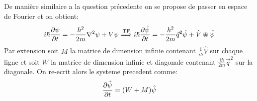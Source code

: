 \documentclass[10pt,a4paper]{article}
\begin{document}
\subsection{}
De manière similaire a la question précedente on se propose de passer en espace de Fourier et on obtient:
\[
i \hbar \pdv{\psi}{t} = -\frac{\hbar^2}{2m}\laplacian \psi + V \psi \stackrel{\text{TF}}{\Longrightarrow} i \hbar \pdv{\hat{\psi}}{t} = - \frac{\hbar^2}{2m} \vec{q}^2 \hat{\psi} + \hat{V} \circledast \hat{\psi} 
\]
Par extension soit $M$ la matrice de dimension infinie contenant $\frac{1}{i\hbar}\hat{V}$ sur chaque ligne et soit $W$ la matrice de dimension infinie et diagonale contenant $\frac{i\hbar}{2m} \vec{q}^2$ sur la diagonale. On re-ecrit alors le systeme precedent comme:
\[
\pdv{\hat{\psi}}{t} = (W + M) \hat{\psi}
\]
\end{document}
